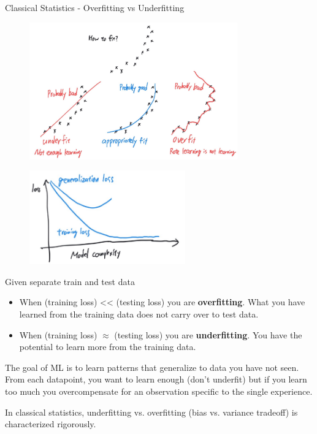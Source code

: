 \begin{frame}[allowframebreaks]

\begin{mydefinitionblock}{6.3}{Classical Statistics - Overfitting vs Underfitting}
    \begin{figure}[H]
        \centering
        \includegraphics[width=0.8\textwidth]{.././assets/6.2.jpg}
    \end{figure}

    \begin{figure}[H]
        \centering
        \includegraphics[width=0.6\textwidth]{.././assets/6.3.png}
    \end{figure}

    Given separate train and test data

    \begin{itemize}
        \item When (training loss) << (testing loss) you are \textbf{overfitting}. What you have learned from the training data does not carry over to test data.
        \item When (training loss) $\approx$ (testing loss) you are \textbf{underfitting}. You have the potential to learn more from the training data.
    \end{itemize}

    \par\noindent\textcolor{gray}{\hdashrule{\textwidth}{0.4pt}{1pt 2pt}}

    The goal of ML is to learn patterns that generalize to data you have not seen. From each datapoint, you want to learn enough (don't underfit) but if you learn too much you overcompensate for an observation specific to the single experience.

    In classical statistics, underfitting vs. overfitting (bias vs. variance tradeoff) is characterized rigorously.
\end{mydefinitionblock}

\end{frame}

